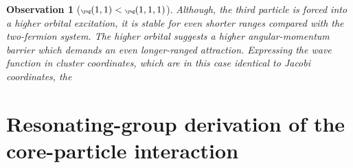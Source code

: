 \documentclass[aps,prd,onecolumn
,tightenlines,letterpaper,
notitlepage,11pt,
nofootinbib]{revtex4-1}
\begin{document}
\newtheorem{obs}{Observation}

\begin{obs}[${\tiny\yng(1,1)}<{\tiny\yng(1,1,1)}$]
Although, the third particle is forced into a higher orbital excitation, it is stable for even shorter ranges compared with the two-fermion system.
The higher orbital suggests a higher angular-momentum barrier which demands an even longer-ranged attraction. Expressing the wave function in cluster
coordinates, which are in this case identical to Jacobi coordinates, the 
\end{obs}

\section{Resonating-group derivation of the core-particle interaction}
\end{document}
